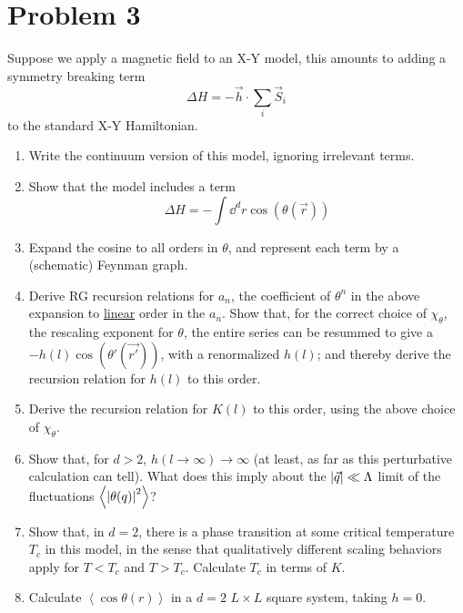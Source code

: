 \documentclass[12pt]{article}
\newcommand{\avg}[1]{\left<#1\right>}
\begin{document}
\section*{Problem 3}
Suppose we apply a magnetic field to an X-Y model, this amounts to adding a symmetry breaking term
\begin{equation*}
    \Delta H = -\vec{h}\cdot\sum_i \vec{S}_i
    \tag{3.1}
\end{equation*}
to the standard X-Y Hamiltonian.
\begin{enumerate}[label=(\alph*)]
    \item Write the continuum version of this model, ignoring irrelevant terms.
    \item Show that the model includes a term
    \begin{equation*}
        \Delta H = - \int \dd^dr\cos(\theta(\vec{r}))
        \tag{3.2}
    \end{equation*}
    \item Expand the cosine to all orders in $\theta$, and represent each term by a (schematic) Feynman graph.
    \item Derive RG recursion relations for $a_n$, the coefficient of $\theta^n$ in the above expansion to \underline{linear} order in the $a_n$. Show that, for the correct choice of $\chi_\theta$, the rescaling exponent for $\theta$, the entire series can be resummed to give a $-h(l)\cos(\theta'(\vec{r'}))$, with a renormalized $h(l)$; and thereby derive the recursion relation for $h(l)$ to this order.
    \item Derive the recursion relation for $K(l)$ to this order, using the above choice of $\chi_\theta$.
    \item Show that, for $d>2$, $h(l\to\infty)\to\infty$ (at least, as far as this perturbative calculation can tell). What does this imply about the $\abs{\vec{q}} \ll \Lambda$ limit of the fluctuations $\avg{\abs{\theta(q)}^2}$?
    \item Show that, in $d=2$, there is a phase transition at some critical temperature $T_c$ in this model, in the sense that qualitatively different scaling behaviors apply for $T<T_c$ and $T>T_c$. Calculate $T_c$ in terms of $K$.
    \item Calculate $\avg{\cos\theta(r)}$ in a $d=2$ $L\times L$ square system, taking $h=0$.
\end{enumerate}
\end{document}
